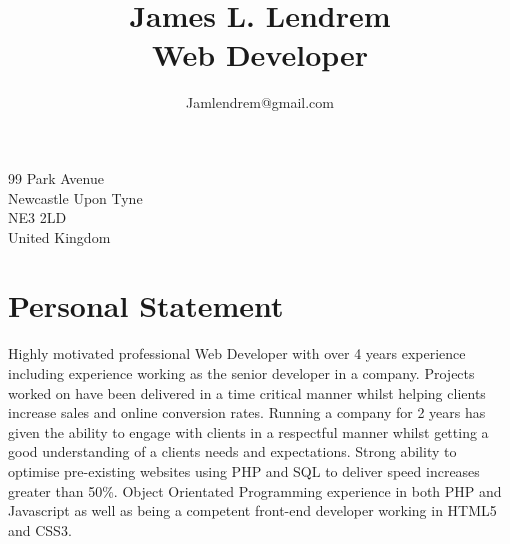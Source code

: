 \documentclass[10pt]{article}
\title{\bfseries\Huge James L. Lendrem\\Web Developer}
\author{Jamlendrem@gmail.com}
\date{}
\begin{document}
\maketitle

\begin{minipage}[ht]{0.48\textwidth}
99 Park Avenue\\
Newcastle Upon Tyne\\
NE3 2LD\\
United Kingdom\\
\end{minipage}

\newcommand\VRule{\color{lightgray}\vrule width 0.5pt}

\section*{Personal Statement}
Highly motivated professional Web Developer with over 4 years experience including experience working as the senior developer in a company. Projects worked on have been delivered in a time critical manner whilst helping clients increase sales and online conversion rates. Running a company for 2 years has given the ability to engage with clients in a respectful manner whilst getting a good understanding of a clients needs and expectations. Strong ability to optimise pre-existing websites using PHP and SQL to deliver speed increases greater than 50\%. Object Orientated Programming experience in both PHP and Javascript as well as being a competent front-end developer working in HTML5 and CSS3.
\end{document}
